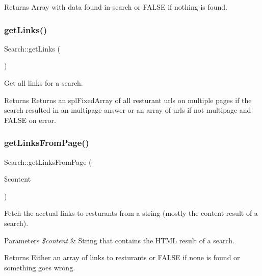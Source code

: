 \begin{DoxyReturn}{Returns}
Array with data found in search or F\+A\+L\+SE if nothing is found. 
\end{DoxyReturn}
\hypertarget{class_search_ac74e4ae4005b43140ce27fa3be53803a}{}\label{class_search_ac74e4ae4005b43140ce27fa3be53803a} 
\subsubsection{\texorpdfstring{get\+Links()}{getLinks()}}
{\footnotesize\ttfamily Search\+::get\+Links (\begin{DoxyParamCaption}{ }\end{DoxyParamCaption})\hspace{0.3cm}{\ttfamily [private]}}



Get all links for a search. 

\begin{DoxyReturn}{Returns}
Returns an spl\+Fixed\+Array of all resturant urls on multiple pages if the search resulted in an multipage answer or an array of urls if not multipage and F\+A\+L\+SE on error. 
\end{DoxyReturn}
\hypertarget{class_search_a0b07d40d538cc7c3f49e2906da900759}{}\label{class_search_a0b07d40d538cc7c3f49e2906da900759} 
\subsubsection{\texorpdfstring{get\+Links\+From\+Page()}{getLinksFromPage()}}
{\footnotesize\ttfamily Search\+::get\+Links\+From\+Page (\begin{DoxyParamCaption}\item[{}]{\$content }\end{DoxyParamCaption})\hspace{0.3cm}{\ttfamily [private]}}



Fetch the acctual links to resturants from a string (mostly the content result of a search). 


\begin{DoxyParams}{Parameters}
{\em \$content} & String that contains the H\+T\+ML result of a search. \\
\hline
\end{DoxyParams}
\begin{DoxyReturn}{Returns}
Either an array of links to resturants or F\+A\+L\+SE if none is found or something goes wrong. 
\end{DoxyReturn}
\hypertarget{class_search_ada895dffcd96b9471758c63f17363df1}{}\label{class_search_ada895dffcd96b9471758c63f17363df1} 
